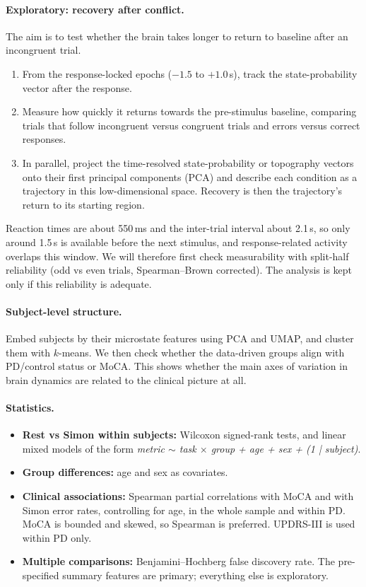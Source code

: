\documentclass[11pt,a4paper]{article}
\begin{document}
\paragraph{Exploratory: recovery after conflict.} The aim is to test whether the brain takes longer to return to baseline after an incongruent trial.
\begin{enumerate}
  \item From the response-locked epochs ($-1.5$ to $+1.0$\,s), track the state-probability vector after the response.
  \item Measure how quickly it returns towards the pre-stimulus baseline, comparing trials that follow incongruent versus congruent trials and errors versus correct responses.
  \item In parallel, project the time-resolved state-probability or topography vectors onto their first principal components (PCA) and describe each condition as a trajectory in this low-dimensional space. Recovery is then the trajectory's return to its starting region.
\end{enumerate}
Reaction times are about 550\,ms and the inter-trial interval about 2.1\,s, so only around 1.5\,s is available before the next stimulus, and response-related activity overlaps this window. We will therefore first check measurability with split-half reliability (odd vs even trials, Spearman--Brown corrected). The analysis is kept only if this reliability is adequate.

\paragraph{Subject-level structure.} Embed subjects by their microstate features using PCA and UMAP, and cluster them with $k$-means. We then check whether the data-driven groups align with PD/control status or MoCA. This shows whether the main axes of variation in brain dynamics are related to the clinical picture at all.

\paragraph{Statistics.}
\begin{itemize}
  \item \textbf{Rest vs Simon within subjects:} Wilcoxon signed-rank tests, and linear mixed models of the form \emph{metric $\sim$ task $\times$ group + age + sex + (1 | subject)}.
  \item \textbf{Group differences:} age and sex as covariates.
  \item \textbf{Clinical associations:} Spearman partial correlations with MoCA and with Simon error rates, controlling for age, in the whole sample and within PD. MoCA is bounded and skewed, so Spearman is preferred. UPDRS-III is used within PD only.
  \item \textbf{Multiple comparisons:} Benjamini--Hochberg false discovery rate. The pre-specified summary features are primary; everything else is exploratory.
\end{itemize}
\end{document}
